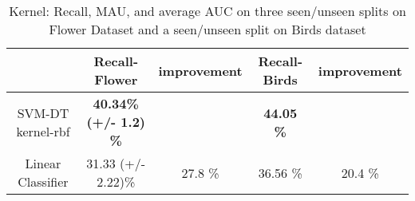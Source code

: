 \begin{table*}[hb!]
\vspace{-1mm}
 \begin{minipage}{0.56\linewidth}
\caption{Kernel: Recall, MAU, and average AUC on three seen/unseen splits on Flower Dataset and a seen/unseen split on Birds dataset}
\label{tbl:flowerbirdsmauauc}
  \centering
  \scalebox{0.90}
  {
\begin{tabular}{|c|c|c|c|c|}
\hline 
  & \textbf{Recall-Flower} & improvement & \textbf{Recall-Birds}& improvement \\ 
  \hline 
{SVM-DT kernel-rbf }& \textbf{40.34\% (+/-  1.2) \%} & & \textbf{44.05 \%}   &  \\ 
\hline 
Linear Classifier  & 31.33  (+/-  2.22)\% & 27.8 \%  & 36.56 \% & 20.4 \% \\ 
\hline 
\end{tabular}}


\end{minipage}
\end{table*}
